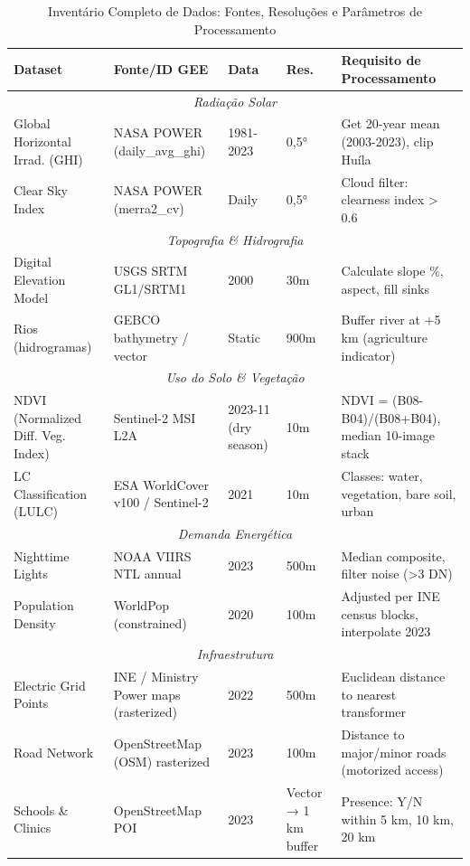\documentclass[12pt, a4paper]{article}
\begin{document}
\begin{table}[H]
\centering
\caption{Inventário Completo de Dados: Fontes, Resoluções e Parâmetros de Processamento}
\label{tab:data_inventory}
\footnotesize
\begin{tabular}{|l|l|l|l|l|}
\hline
\textbf{Dataset} & \textbf{Fonte/ID GEE} & \textbf{Data} & \textbf{Res.} & \textbf{Requisito de Processamento} \\
\hline
\multicolumn{5}{|c|}{\textit{Radiação Solar}} \\
\hline
Global Horizontal Irrad. (GHI) & NASA POWER (daily\_avg\_ghi) & 1981-2023 & 0,5° & Get 20-year mean (2003-2023), clip Huíla \\
Clear Sky Index & NASA POWER (merra2\_cv) & Daily & 0,5° & Cloud filter: clearness index > 0.6 \\
\hline
\multicolumn{5}{|c|}{\textit{Topografia \& Hidrografia}} \\
\hline
Digital Elevation Model & USGS SRTM GL1/SRTM1 & 2000 & 30m & Calculate slope \%, aspect, fill sinks \\
Rios (hidrogramas) & GEBCO bathymetry / vector & Static & 900m & Buffer river at +5 km (agriculture indicator) \\
\hline
\multicolumn{5}{|c|}{\textit{Uso do Solo \& Vegetação}} \\
\hline
NDVI (Normalized Diff. Veg. Index) & Sentinel-2 MSI L2A & 2023-11 (dry season) & 10m & NDVI = (B08-B04)/(B08+B04), median 10-image stack \\
LC Classification (LULC) & ESA WorldCover v100 / Sentinel-2 & 2021 & 10m & Classes: water, vegetation, bare soil, urban \\
\hline
\multicolumn{5}{|c|}{\textit{Demanda Energética}} \\
\hline
Nighttime Lights & NOAA VIIRS NTL annual & 2023 & 500m & Median composite, filter noise (>3 DN) \\
Population Density & WorldPop (constrained) & 2020 & 100m & Adjusted per INE census blocks, interpolate 2023 \\
\hline
\multicolumn{5}{|c|}{\textit{Infraestrutura}} \\
\hline
Electric Grid Points & INE / Ministry Power maps (rasterized) & 2022 & 500m & Euclidean distance to nearest transformer \\
Road Network & OpenStreetMap (OSM) rasterized & 2023 & 100m & Distance to major/minor roads (motorized access) \\
Schools \& Clinics & OpenStreetMap POI & 2023 & Vector → 1 km buffer & Presence: Y/N within 5 km, 10 km, 20 km \\
\hline
\end{tabular}
\end{table}
\end{document}
